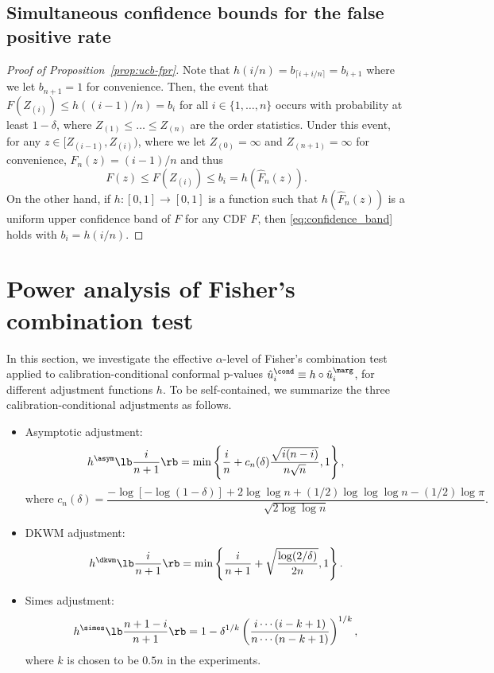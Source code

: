 \subsection{Simultaneous confidence bounds for the false positive rate}

\begin{proof}[Proof of Proposition~\ref{prop:ucb-fpr}]
Note that $h(i / n) = b_{\lceil i + i/n\rceil} = b_{i+1}$ where we let $b_{n+1} = 1$ for  convenience. Then, the event that $F(Z_{(i)})\le h((i - 1) / n) = b_{i}$ for all $i \in \{1, \ldots, n\}$ occurs with probability at least $1 - \delta$, where $Z_{(1)}\le \ldots\le Z_{(n)}$ are the order statistics. Under this event, for any $z \in [Z_{(i-1)}, Z_{(i)})$, where we let $Z_{(0)} = \infty$ and $Z_{(n+1)} = \infty$ for convenience, $\hat{F}_{n}(z) = (i - 1) / n$ and thus
\[F(z)\le F(Z_{(i)})\le b_{i} = h\left(\hat{F}_{n}(z)\right).\]
On the other hand, if $h: [0, 1]\rightarrow [0, 1]$ is a function such that $h(\hat{F}_{n}(z))$ is a uniform upper confidence band of $F$ for any CDF $F$, then \eqref{eq:confidence_band} holds with $b_{i} = h(i / n)$.
\end{proof}


\section{Power analysis of Fisher's combination test}\label{sec:power_fisher}

In this section, we investigate the effective $\alpha$-level of Fisher's combination test applied to calibration-conditional conformal p-values $\hat{u}_i^\cond \equiv h\circ \hat{u}_i^\marg$, for different adjustment functions $h$. To be self-contained, we summarize the three calibration-conditional adjustments as follows.
\begin{itemize}
\item Asymptotic adjustment:
  \begin{equation}
    \label{eq:asym}
    h^\asym\lb \frac{i}{n+1}\rb = \min\left\{\frac{i}{n} + c_n(\delta)\frac{\sqrt{i(n - i)}}{n\sqrt{n}}, 1\right\},
  \end{equation}
  \[\text{where } c_n(\delta) = \frac{-\log[-\log(1-\delta)]+2\log\log n + (1/2) \log \log \log n - (1/2) \log\pi }{\sqrt{2 \log \log n}}.\]
\item DKWM adjustment:
  \[h^\dkwm\lb \frac{i}{n+1}\rb = \min\left\{\frac{i}{n+1} + \sqrt{\frac{\log(2/\delta)}{2n}}, 1\right\}.\]
\item Simes adjustment:
  \[h^\simes\lb \frac{n+1 - i}{n+1}\rb = 1 - \delta^{1/k}\left(\frac{i\cdots (i - k + 1)}{n\cdots (n - k + 1)}\right)^{1/k},\]
  where $k$ is chosen to be $0.5 n$ in the experiments.
\end{itemize}

